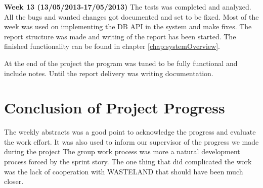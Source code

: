 \textbf{Week 13 (13/05/2013-17/05/2013)}
The tests was completed and analyzed. 
All the bugs and wanted changes got documented and set to be fixed.
Most of the week was used on implementing the DB API in the system and make fixes.     
The report structure was made and writing of the report has been started. 
The finished functionality can be found in chapter \vref{chap:systemOverview}.
 
At the end of the project the program was tuned to be fully functional and include notes.
Until the report delivery was writing documentation.       

\section{Conclusion of Project Progress}
The weekly abstracts was a good point to acknowledge the progress and evaluate the work effort. It was also used to inform our supervisor of the progress we made during the project
The group work process was more a natural development process forced by the sprint story.       
The one thing that did complicated the work was the lack of cooperation with WASTELAND that should have been much closer. 
\label{sec:conclusionofProjectProgress}

